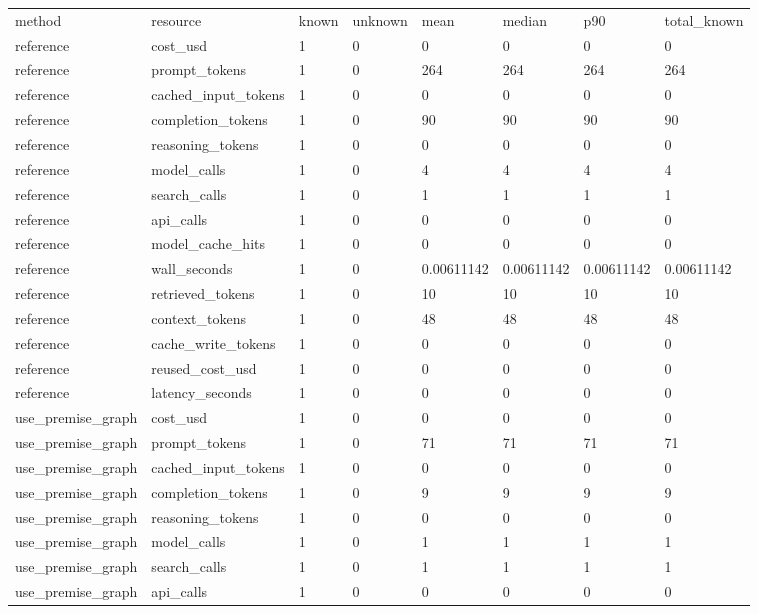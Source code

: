 \begin{tabular}{llllllll}
\hline
method & resource & known & unknown & mean & median & p90 & total\_known \\
reference & cost\_usd & 1 & 0 & 0 & 0 & 0 & 0 \\
reference & prompt\_tokens & 1 & 0 & 264 & 264 & 264 & 264 \\
reference & cached\_input\_tokens & 1 & 0 & 0 & 0 & 0 & 0 \\
reference & completion\_tokens & 1 & 0 & 90 & 90 & 90 & 90 \\
reference & reasoning\_tokens & 1 & 0 & 0 & 0 & 0 & 0 \\
reference & model\_calls & 1 & 0 & 4 & 4 & 4 & 4 \\
reference & search\_calls & 1 & 0 & 1 & 1 & 1 & 1 \\
reference & api\_calls & 1 & 0 & 0 & 0 & 0 & 0 \\
reference & model\_cache\_hits & 1 & 0 & 0 & 0 & 0 & 0 \\
reference & wall\_seconds & 1 & 0 & 0.00611142 & 0.00611142 & 0.00611142 & 0.00611142 \\
reference & retrieved\_tokens & 1 & 0 & 10 & 10 & 10 & 10 \\
reference & context\_tokens & 1 & 0 & 48 & 48 & 48 & 48 \\
reference & cache\_write\_tokens & 1 & 0 & 0 & 0 & 0 & 0 \\
reference & reused\_cost\_usd & 1 & 0 & 0 & 0 & 0 & 0 \\
reference & latency\_seconds & 1 & 0 & 0 & 0 & 0 & 0 \\
use\_premise\_graph & cost\_usd & 1 & 0 & 0 & 0 & 0 & 0 \\
use\_premise\_graph & prompt\_tokens & 1 & 0 & 71 & 71 & 71 & 71 \\
use\_premise\_graph & cached\_input\_tokens & 1 & 0 & 0 & 0 & 0 & 0 \\
use\_premise\_graph & completion\_tokens & 1 & 0 & 9 & 9 & 9 & 9 \\
use\_premise\_graph & reasoning\_tokens & 1 & 0 & 0 & 0 & 0 & 0 \\
use\_premise\_graph & model\_calls & 1 & 0 & 1 & 1 & 1 & 1 \\
use\_premise\_graph & search\_calls & 1 & 0 & 1 & 1 & 1 & 1 \\
use\_premise\_graph & api\_calls & 1 & 0 & 0 & 0 & 0 & 0 \\

\end{tabular}
